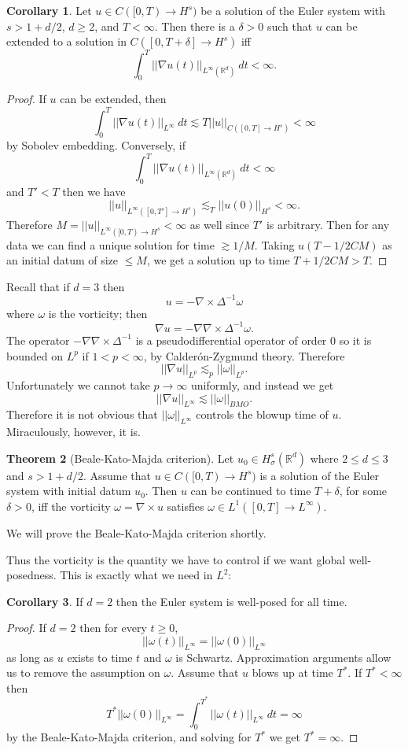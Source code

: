 \documentclass[12pt]{book}
\newcommand{\RR}{\mathbb{R}}
\theoremstyle{definition}
\newtheorem{theorem}{Theorem}[chapter]
\newtheorem{corollary}[theorem]{Corollary}
\begin{document}
\begin{corollary}
Let $u \in C([0, T) \to H^s)$ be a solution of the Euler system with $s > 1 + d/2$, $d \geq 2$, and $T < \infty$.
Then there is a $\delta > 0$ such that $u$ can be extended to a solution in $C([0, T + \delta] \to H^s)$ iff
$$\int_0^T ||\nabla u(t)||_{L^\infty(\RR^d)} ~dt < \infty.$$
\end{corollary}
\begin{proof}
If $u$ can be extended, then
$$\int_0^T ||\nabla u(t)||_{L^\infty} ~dt \lesssim T ||u||_{C([0, T] \to H^s)} < \infty$$
by Sobolev embedding.
Conversely, if
$$\int_0^T ||\nabla u(t)||_{L^\infty(\RR^d)} ~dt < \infty$$
and $T' < T$ then we have
$$||u||_{L^\infty([0, T'] \to H^s)} \lesssim_T ||u(0)||_{H^s} < \infty.$$
Therefore $M = ||u||_{L^\infty([0, T) \to H^s} < \infty$ as well since $T'$ is arbitrary.
Then for any data we can find a unique solution for time $\gtrsim 1/M$.
Taking $u(T - 1/2CM)$ as an initial datum of size $\leq M$, we get a solution up to time $T + 1/2CM > T$.
\end{proof}

Recall that if $d = 3$ then
$$u = -\nabla \times \Delta^{-1} \omega$$
where $\omega$ is the vorticity; then
$$\nabla u = - \nabla\nabla \times \Delta^{-1}\omega.$$
The operator $-\nabla\nabla \times \Delta^{-1}$ is a pseudodifferential operator of order $0$ so it is bounded on $L^p$ if $1 < p < \infty$, by Calder\'on-Zygmund theory.
Therefore
$$||\nabla u||_{L^p} \lesssim_p ||\omega||_{L^p}.$$
Unfortunately we cannot take $p \to \infty$ uniformly, and instead we get
$$||\nabla u||_{L^\infty} \lesssim ||\omega||_{BMO}.$$
Therefore it is not obvious that $||\omega||_{L^\infty}$ controls the blowup time of $u$.
Miraculously, however, it is.

\begin{theorem}[Beale-Kato-Majda criterion]
Let $u_0 \in H^s_\sigma(\RR^d)$ where $2 \leq d \leq 3$ and $s > 1 + d/2$.
Assume that $u \in C([0, T) \to H^s)$ is a solution of the Euler system with initial datum $u_0$.
Then $u$ can be continued to time $T + \delta$, for some $\delta > 0$, iff the vorticity $\omega = \nabla \times u$ satisfies $\omega \in L^1([0, T] \to L^\infty)$.
\end{theorem}

We will prove the Beale-Kato-Majda criterion shortly.

Thus the vorticity is the quantity we have to control if we want global well-posedness.
This is exactly what we need in $L^2$:

\begin{corollary}
If $d = 2$ then the Euler system is well-posed for all time.
\end{corollary}
\begin{proof}
If $d = 2$ then for every $t \geq 0$,
$$||\omega(t)||_{L^\infty} = ||\omega(0)||_{L^\infty}$$
as long as $u$ exists to time $t$ and $\omega$ is Schwartz.
Approximation arguments allow us to remove the assumption on $\omega$.
Assume that $u$ blows up at time $T^*$.
If $T^* < \infty$ then
$$T^* ||\omega(0)||_{L^\infty} = \int_0^{T^*} ||\omega(t)||_{L^\infty} ~dt = \infty$$
by the Beale-Kato-Majda criterion, and solving for $T^*$ we get $T^* = \infty$.
\end{proof}
\end{document}
